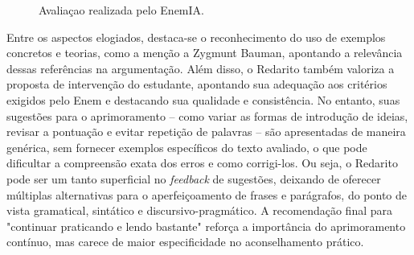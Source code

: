 \documentclass[portuguese]{textolivre}
\begin{document}
\begin{figure}[htbp]
\centering
\begin{minipage}{\textwidth}
 \caption{Avaliaçao realizada pelo EnemIA.}
 \label{fig04}
\end{minipage}
\end{figure}

Entre os aspectos elogiados, destaca-se o reconhecimento do uso de exemplos concretos e teorias, como a menção a Zygmunt Bauman, apontando a relevância dessas referências na argumentação. Além disso, o Redarito também valoriza a proposta de intervenção do estudante, apontando sua adequação aos critérios exigidos pelo Enem e destacando sua qualidade e consistência. No entanto, suas sugestões para o aprimoramento – como variar as formas de introdução de ideias, revisar a pontuação e evitar repetição de palavras – são apresentadas de maneira genérica, sem fornecer exemplos específicos do texto avaliado, o que pode dificultar a compreensão exata dos erros e como corrigi-los. Ou seja, o Redarito pode ser um tanto superficial no \textit{feedback} de sugestões, deixando de oferecer múltiplas alternativas para o aperfeiçoamento de frases e parágrafos, do ponto de vista gramatical, sintático e discursivo-pragmático. A recomendação final para "continuar praticando e lendo bastante" reforça a importância do aprimoramento contínuo, mas carece de maior especificidade no aconselhamento prático.
\end{document}
